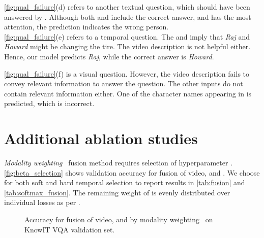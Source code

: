 \documentclass[10pt,twocolumn,letterpaper]{article}
\makeatletter
\renewcommand\paragraph{\@startsection{paragraph}{4}{\z@}{1ex}{-1em}{\normalfont\normalsize\bfseries}}
\makeatother
\begin{document}
\autoref{fig:qual_failure}(d) refers to another textual question, which should have been answered by \sceneSum. Although both \sceneSum and \episodeSum include the correct answer, and \episodeSum has the most attention, the prediction indicates the wrong person.\\

\autoref{fig:qual_failure}(e) refers to a temporal question. The \sceneSum and \episodeSum imply that \emph{Raj} and \emph{Howard} might be changing the tire. The video description is not helpful either. Hence, our model predicts \emph{Raj}, while the correct answer is \emph{Howard}.

\autoref{fig:qual_failure}(f) is a visual question. However, the video description fails to convey relevant information to answer the question. The other inputs do not contain relevant information either. One of the character names appearing in \episodeSum is predicted, which is incorrect.



\section{Additional ablation studies}
\label{sec:add-ablation}

\paragraph{Hyperparameter validation}

\emph{Modality weighting}~\cite{garcia2020knowledge} fusion method requires selection of hyperparameter . \autoref{fig:beta_selection} shows validation accuracy \vs  for fusion of video, \sceneSum and \episodeSum. We choose  for both soft and hard temporal selection to report results in \autoref{tab:fusion} and \autoref{tab:softmax_fusion}. The remaining weight of  is evenly distributed over individual \branch losses as  per \branch.

\begin{figure}
\centering
\small
{}
\caption{Accuracy \vs  for fusion of video, \sceneSum and \episodeSum by modality weighting~\cite{garcia2020knowledge} on KnowIT VQA validation set.}
\label{fig:beta_selection}
\end{figure}
\end{document}
